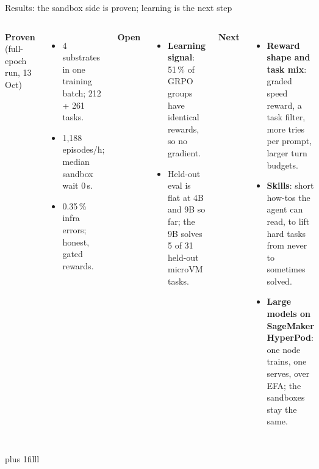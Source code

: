 \begin{frame}{Results: the sandbox side is proven; learning is the next step}
\begin{columns}[T]
{\normalsize\textbf{\textcolor{awsteal}{Proven}} \small(full-epoch run, 13 Oct)}
\begin{itemize}\small\setlength{\itemsep}{1.2mm}
\item 4 substrates in one training batch; 212 + 261 tasks.
\item 1{,}188 episodes/h; median sandbox wait 0\,s.
\item 0.35\,\% infra errors; honest, gated rewards.
\end{itemize}
\vspace{1mm}
{\normalsize\textbf{\textcolor{awsmagenta}{Open}}}
\begin{itemize}\small\setlength{\itemsep}{1.2mm}
\item \textbf{Learning signal}: 51\,\% of GRPO groups have identical rewards, so no gradient.
\item Held-out eval is flat at 4B and 9B so far; the 9B solves 5 of 31 held-out microVM tasks.
\end{itemize}
{\normalsize\textbf{Next}}
\begin{itemize}\small\setlength{\itemsep}{1.2mm}
\item \textbf{Reward shape and task mix}: graded speed reward, a task filter, more tries per prompt, larger turn budgets.
\item \textbf{Skills}: short how-tos the agent can read, to lift hard tasks from never to sometimes solved.
\item \textbf{Large models on SageMaker HyperPod}: one node trains, one serves, over EFA; the sandboxes stay the same.
\end{itemize}
\end{columns}
\par\vskip 0pt plus 1filll
\end{frame}

